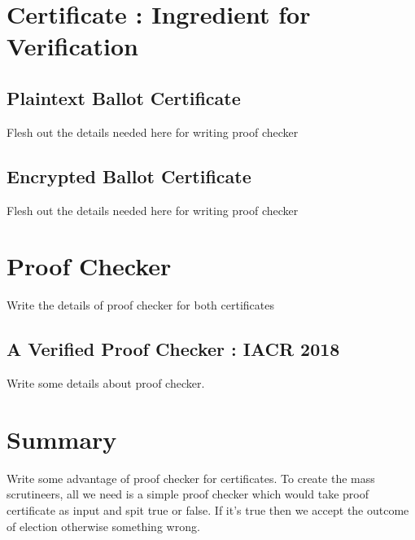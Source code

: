 %



\section{Certificate : Ingredient for Verification}
   
   \subsection{Plaintext Ballot Certificate}
    Flesh out the details needed here for writing proof checker
    
    \subsection{Encrypted Ballot Certificate}
    Flesh out the details needed here for writing proof checker
    
   
\section{Proof Checker}
  Write the details of proof checker for both certificates
  
  	\subsection{A Verified Proof Checker : IACR 2018}
  	Write some details about proof checker.
  
\section{Summary}
   Write some advantage of proof checker for certificates.
   To create the mass scrutineers, all we need is a simple proof checker
   which would take proof certificate as input and spit true or false.
   If it's true then we accept the outcome of election otherwise something 
   wrong.